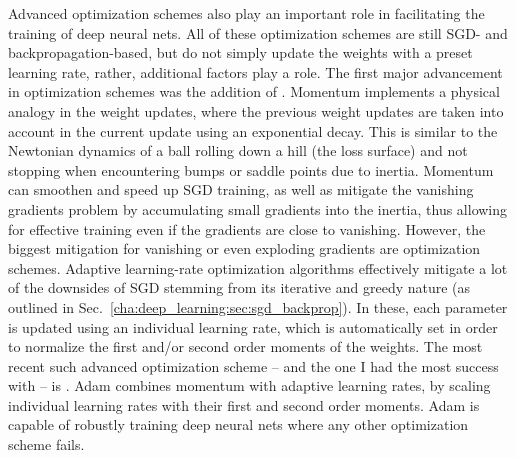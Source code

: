 			Advanced optimization schemes also play an important role in facilitating the training of deep neural nets.
			All of these optimization schemes are still \ac{SGD}- and backpropagation-based, but do not simply update the weights with a preset learning rate, rather, additional factors play a role.
			The first major advancement in optimization schemes was the addition of .
			Momentum implements a physical analogy in the weight updates, where the previous weight updates are taken into account in the current update using an exponential decay.		
			This is similar to the Newtonian dynamics of a ball rolling down a hill (the loss surface) and not stopping when encountering bumps or saddle points due to inertia.
			Momentum can smoothen and speed up \ac{SGD} training, as well as mitigate the vanishing gradients problem by accumulating small gradients into the inertia, thus allowing for effective training even if the gradients are close to vanishing.
			However, the biggest mitigation for vanishing or even exploding gradients are  optimization schemes.
			Adaptive learning-rate optimization algorithms effectively mitigate a lot of the downsides of \ac{SGD} stemming from its iterative and greedy nature (as outlined in Sec.~\ref{cha:deep_learning:sec:sgd_backprop}).
			In these, each parameter is updated using an individual learning rate, which is automatically set in order to normalize the first and/or second order moments of the weights.
			The most recent such advanced optimization scheme -- and the one I had the most success with -- is  \cite{adam}.
			\ac{Adam} combines momentum with adaptive learning rates, by scaling individual learning rates with their first and second order moments.
			\ac{Adam} is capable of robustly training deep neural nets where any other optimization scheme fails.	
			

